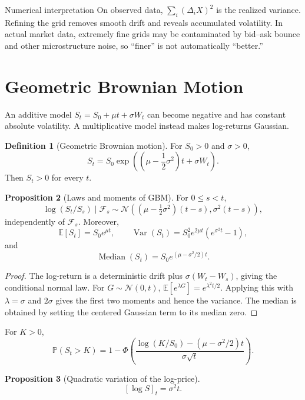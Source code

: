\documentclass[10pt]{article}
\newcommand{\E}{\mathbb E}
\newcommand{\Pbb}{\mathbb P}
\newcommand{\Var}{\operatorname{Var}}
\newcommand{\1}{\mathbf 1}
\newcommand{\cF}{\mathcal F}
\theoremstyle{definition}
\newtheorem{definition}{Definition}[section]
\newtheorem{proposition}[definition]{Proposition}
\begin{document}
\begin{keyidea}{Numerical interpretation}
On observed data, \(\sum_i(\Delta_iX)^2\) is the realized variance. Refining
the grid removes smooth drift and reveals accumulated volatility. In actual
market data, extremely fine grids may be contaminated by bid--ask bounce and
other microstructure noise, so ``finer'' is not automatically ``better.''
\end{keyidea}

\section{Geometric Brownian Motion}

An additive model \(S_t=S_0+\mu t+\sigma W_t\) can become negative and has
constant absolute volatility. A multiplicative model instead makes log-returns
Gaussian.

\begin{definition}[Geometric Brownian motion]
For \(S_0>0\) and \(\sigma>0\),
\[
S_t=S_0\exp\!\left(
\left(\mu-\frac12\sigma^2\right)t+\sigma W_t
\right).
\]
Then \(S_t>0\) for every \(t\).
\end{definition}

\begin{proposition}[Laws and moments of GBM]
For \(0\leq s<t\),
\[
\log(S_t/S_s)\mid\cF_s
\sim\mathcal N\!\left(
(\mu-\tfrac12\sigma^2)(t-s),\sigma^2(t-s)
\right),
\]
independently of \(\cF_s\). Moreover,
\[
\E[S_t]=S_0e^{\mu t},
\qquad
\Var(S_t)=S_0^2e^{2\mu t}(e^{\sigma^2t}-1),
\]
and
\[
\operatorname{Median}(S_t)
=S_0e^{(\mu-\sigma^2/2)t}.
\]
\end{proposition}

\begin{proof}
The log-return is a deterministic drift plus
\(\sigma(W_t-W_s)\), giving the conditional normal law. For
\(G\sim\mathcal N(0,t)\),
\(\E[e^{\lambda G}]=e^{\lambda^2t/2}\). Applying this with
\(\lambda=\sigma\) and \(2\sigma\) gives the first two moments and hence the
variance. The median is obtained by setting the centered Gaussian term to its
median zero.
\end{proof}

For \(K>0\),
\[
\Pbb(S_t>K)
=1-\Phi\!\left(
\frac{\log(K/S_0)-(\mu-\sigma^2/2)t}{\sigma\sqrt t}
\right).
\]

\begin{proposition}[Quadratic variation of the log-price]
\[
[\log S]_t=\sigma^2t.
\]
\end{proposition}
\end{document}
